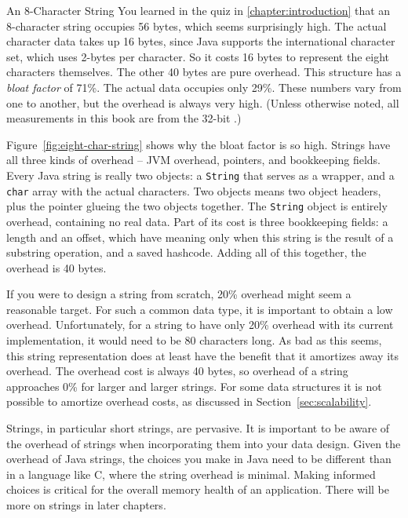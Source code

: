 \begin{example}{An 8-Character String}
 You learned in the quiz in \autoref{chapter:introduction} that an 8-character
 string occupies 56 bytes, which seems surprisingly high. The actual character data takes up 16
 bytes, since Java supports the international character set, which uses 2-bytes
 per character. So it costs 16 bytes to represent the eight characters
 themselves. The other 40 bytes are pure overhead. This structure has a
 \emph{bloat factor} of 71\%. The actual data occupies only 29\%. These numbers
 vary from one \jre to another, but the overhead is always very high. (Unless
 otherwise noted, all measurements in this book are from the 32-bit \oracle
 \javasix \jre.)

Figure~\ref{fig:eight-char-string} shows why the bloat factor is so high.
Strings have all three kinds of overhead -- JVM overhead, pointers, and
bookkeeping fields. Every Java string is really two objects: a {\tt String} that
serves as a wrapper, and a {\tt char} array with the actual characters. Two
objects means two object headers, plus the pointer glueing the two objects
together. The {\tt String} object is entirely overhead, containing no real data.
Part of its cost is three bookkeeping fields: a length and an offset, which have
meaning only when this string is the result of a substring operation, and a
saved hashcode. Adding all of this together, the overhead is 40 bytes.
\end{example}

If you were to design a string from scratch, 20\% overhead might seem a
reasonable target. For such a common data type, it is important to obtain a low
overhead.
Unfortunately, for a string to have only 20\% overhead with its current
implementation, it would need to be 80 characters long. As bad as this seems,
this string representation does at least have the benefit that it amortizes away
its overhead. The overhead cost is always 40 bytes, so overhead of a string
approaches 0\% for larger and larger strings.  For some data structures it is
not possible to amortize overhead costs, as discussed in
Section~\ref{sec:scalability}.

Strings, in particular short strings, are pervasive. It is important to be aware
of the overhead of strings when incorporating them into your data design. Given
the overhead of Java strings, the choices you make in Java need to be different
than in a language like C, where the string overhead is minimal. Making informed
choices is critical for the overall memory health of an application. There will
be more on strings in later chapters.

